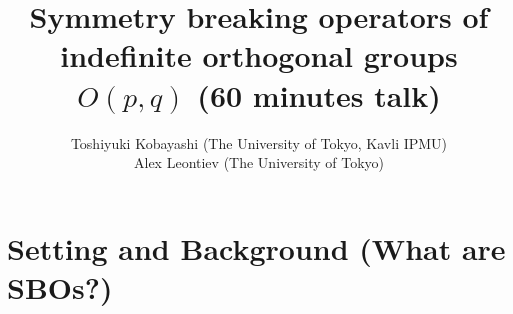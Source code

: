 \documentclass[10pt]{article} %
\theoremstyle{definition}
\begin{document}
\title{Symmetry breaking operators of indefinite orthogonal groups $O(p,q)$ (60 minutes talk)}

  \author{Toshiyuki Kobayashi (The University of Tokyo, Kavli IPMU)\\
  Alex Leontiev (The University of Tokyo)}




  \maketitle
{\tableofcontents}
\section{Setting and Background (What are SBOs?)}
\end{document}
